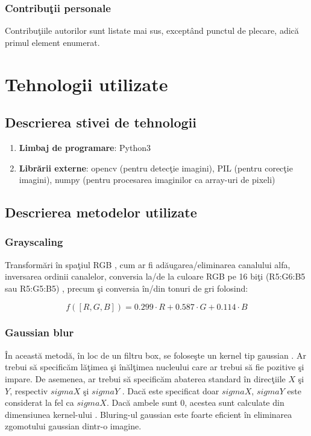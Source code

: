 \documentclass{report}
\begin{document}
\subsection{Contribu\c tii personale}
Contribu\c tiile autorilor sunt listate mai sus, exceptând punctul de plecare, adic\u a primul element enumerat.



\chapter{Tehnologii utilizate}

\section{Descrierea stivei de tehnologii}
\begin{enumerate}
    \item \textbf{Limbaj de programare}: Python3
    \item \textbf{Libr\u arii externe}: opencv \cite{DocsCV} \cite{Minichino2015-do} \cite{Bradski2017-wp} (pentru detec\c tie imagini), PIL \cite{Dey2020-cj} (pentru corec\c tie imagini), numpy \cite{DocsNumpy} (pentru procesarea imaginilor ca array-uri de pixeli)
\end{enumerate}

\section{Descrierea metodelor utilizate}

\subsection{Grayscaling}

Transform\u ari în spa\c tiul RGB \cite{DocsCV}, cum ar fi ad\u augarea/eliminarea canalului alfa, inversarea ordinii canalelor, conversia la/de la culoare RGB pe 16 bi\c ti (R5:G6:B5 sau R5:G5:B5) \cite{DocsNumpy}, precum \c si conversia în/din tonuri de gri folosind:

$$f([R,G,B]) = 0.299\cdot R+0.587\cdot G+0.114\cdot B$$

\subsection{Gaussian blur}

În aceast\u a metod\u a, în loc de un filtru box, se folose\c ste un kernel tip gaussian \cite{Minichino2015-do}. Ar trebui s\u a specific\u am l\u a\c timea \c si în\u al\c timea nucleului care ar trebui s\u a fie pozitive \c si impare. De asemenea, ar trebui s\u a specific\u am abaterea standard în direc\c tiile $X$ \c si $Y$, respectiv $sigmaX$ \c si $sigmaY$ \cite{Minichino2015-do}. Dac\u a este specificat doar $sigmaX$, $sigmaY$ este considerat la fel ca $sigmaX$. Dac\u a ambele sunt $0$, acestea sunt calculate din dimensiunea kernel-ului \cite{Bradski2017-wp}. Bluring-ul gaussian este foarte eficient în eliminarea zgomotului gaussian dintr-o imagine.
\end{document}
